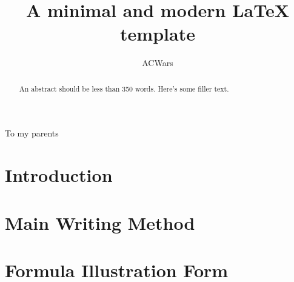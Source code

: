 \documentclass[12pt]{novax}
\title{A minimal and modern LaTeX template}
\author{ACWars}
\begin{document}

\thesistitlepage

\copyrightpage

\begin{abstract}
  An abstract should be less than 350 words. Here's some filler text. \blindtext
\end{abstract}

\renewcommand{\contentsname}{\protect\centering\protect\Large Contents}
\renewcommand{\listtablename}{\protect\centering\protect\Large List of Tables}
\renewcommand{\listfigurename}{\protect\centering\protect\Large List of Figures}

\tableofcontents %

\listoftables
\listoffigures
\begin{acknowledgments}
  \blindtext
\end{acknowledgments}
\begin{dedication}
  To my parents
\end{dedication}


\chapter*{Introduction}\label{ch:intro}


\chapter{Main Writing Method}\label{ch:1}


\chapter{Formula Illustration Form}\label{ch:2}

\end{document}
